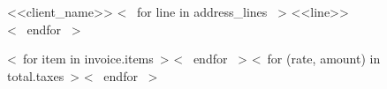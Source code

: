 \documentclass{invoice}
\begin{document}
  \begin{invoiceHead}
  \begin{billto}{<<client_name>>}
    <~ for line in address_lines ~>
      <<line>>\\
    <~ endfor ~>
    \end{billto}

  \end{invoiceHead}

  \begin{invoiceTable}
    <~for item in invoice.items~>
    <~ endfor ~>
    <~for (rate, amount) in total.taxes~>
    <~ endfor ~>
  \end{invoiceTable}
\end{document}
